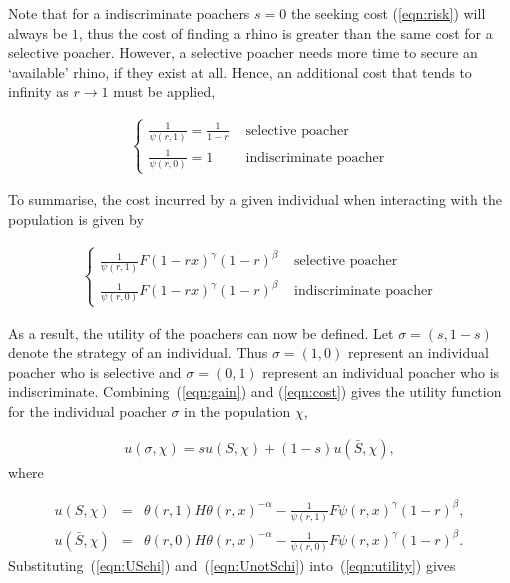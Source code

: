 \documentclass[10pt]{article}
\begin{document}
Note that for a indiscriminate poachers \(s = 0\) the seeking 
cost (\ref{eqn:risk}) will always be \(1\), thus the cost of finding a rhino is greater
than the same cost for a selective poacher. However, a selective poacher needs 
more time to secure an `available' rhino, if they exist at all. Hence, an 
additional cost that tends to infinity as \(r \rightarrow 1\) must be applied, 

\begin{eqnarray}
	\label{eqn:selective_cost}
	\left\{
	\begin{array}{cl}
	\frac{1}{\psi(r, 1)} = \frac{1}{1 - r} & \mbox{ selective poacher}
	\\
	\frac{1}{\psi(r, 0)} = 1 & \mbox{ indiscriminate poacher}
	\end{array} \right.
\end{eqnarray}

To summarise, the cost incurred by a given individual when interacting with
the population is given by 

\begin{eqnarray}
	\label{eqn:cost}
	\left\{
	\begin{array}{cl}
	\frac{1}{\psi(r,1)}  F(1- rx)^{\gamma} (1-r)^{\beta}& \mbox{ selective poacher}
	\\
	\frac{1}{\psi(r,0)} F(1 - rx)^{\gamma} (1-r)^{\beta}& \mbox{ indiscriminate poacher}
	\end{array} \right.
\end{eqnarray}

As a result, the utility of the poachers can now be defined. Let \(\sigma = (s, 1 - s)\)
denote the strategy of an individual. Thus \(\sigma = (1, 0)\) represent an
individual poacher who is selective and \(\sigma = (0, 1)\) represent an individual
poacher who is indiscriminate. Combining~(\ref{eqn:gain}) and (\ref{eqn:cost})
gives the utility function for the individual poacher \(\sigma\) in the population
\(\chi\),

\begin{eqnarray}
\label{eqn:utility}
u(\sigma, \chi) = s u(S,\chi) +(1 - s) u(\bar{S},\chi),
\end{eqnarray}
where

\begin{eqnarray}
\label{eqn:USchi}
u(S,\chi) &=& \theta(r,1) H \theta(r,x)^{-\alpha}
- \frac{1}{\psi(r,1)} F\psi(r, x)^{\gamma} (1-r)^{\beta} ,
\\
\label{eqn:UnotSchi}
u(\bar{S},\chi) &=& \theta(r,0) H \theta(r,x)^{-\alpha}
- \frac{1}{\psi(r,0)} F\psi(r, x)^{\gamma}  (1-r)^{\beta}.
\end{eqnarray}
Substituting~(\ref{eqn:USchi}) and~(\ref{eqn:UnotSchi}) into~(\ref{eqn:utility}) gives
\end{document}
